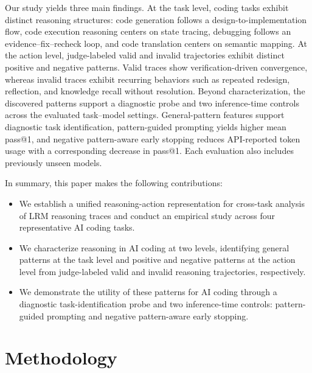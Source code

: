 \documentclass[acmsmall,screen,review,anonymous]{acmart}
\begin{document}
Our study yields three main findings. At the task level, coding tasks exhibit distinct reasoning structures: code generation follows a design-to-implementation flow, code execution reasoning centers on state tracing, debugging follows an evidence--fix--recheck loop, and code translation centers on semantic mapping. At the action level, judge-labeled valid and invalid trajectories exhibit distinct positive and negative patterns. Valid traces show verification-driven convergence, whereas invalid traces exhibit recurring behaviors such as repeated redesign, reflection, and knowledge recall without resolution. Beyond characterization, the discovered patterns support a diagnostic probe and two inference-time controls across the evaluated task--model settings. General-pattern features support diagnostic task identification, pattern-guided prompting yields higher mean pass@1, and negative pattern-aware early stopping reduces API-reported token usage with a corresponding decrease in pass@1. Each evaluation also includes previously unseen models.

In summary, this paper makes the following contributions:

\begin{itemize}[itemsep=1.2mm]

\item We establish a unified reasoning-action representation for cross-task analysis of LRM reasoning traces and conduct an empirical study across four representative AI coding tasks.

\item We characterize reasoning in AI coding at two levels, identifying general patterns at the task level and positive and negative patterns at the action level from judge-labeled valid and invalid reasoning trajectories, respectively.

\item We demonstrate the utility of these patterns for AI coding through a diagnostic task-identification probe and two inference-time controls: pattern-guided prompting and negative pattern-aware early stopping.

\end{itemize}

\section{Methodology}  

\end{document}
